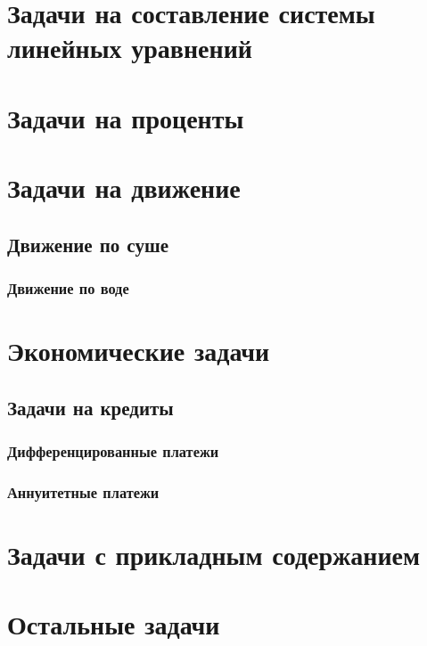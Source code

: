 \documentclass[10pt, a4paper]{article}
\begin{document}
	\section{Задачи на составление системы линейных уравнений}
	\section{Задачи на проценты}
	\section{Задачи на движение}
		\subsection{Движение по суше}
		\subsubsection{Движение по воде}
	\section{Экономические задачи}
		\subsection{Задачи на кредиты}
			\subsubsection{Дифференцированные платежи}
			\subsubsection{Аннуитетные платежи}
	\section{Задачи с прикладным содержанием}
	\section{Остальные задачи}
\end{document}
